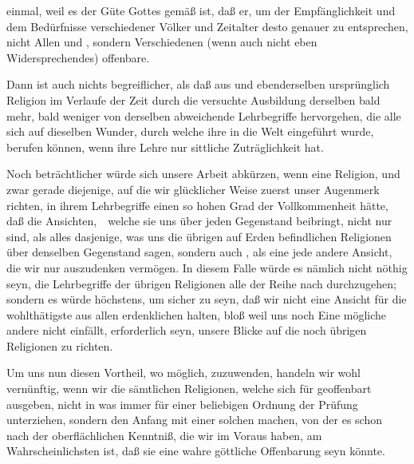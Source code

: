 \begin{aufza}
\begin{aufzb}
\item einmal, weil es der Güte Gottes gemäß ist, daß er, um der Empfänglichkeit und dem Bedürfnisse verschiedener Völker und Zeitalter desto genauer zu entsprechen, nicht Allen  und , sondern Verschiedenen  (wenn auch nicht eben Widersprechendes) offenbare.
\item Dann ist auch nichts begreiflicher, als daß aus  und ebenderselben ursprünglich  Religion im Verlaufe der Zeit durch die versuchte Ausbildung derselben  bald mehr, bald weniger von derselben abweichende Lehrbegriffe hervorgehen, die alle sich auf dieselben Wunder, durch welche ihre  in die Welt eingeführt wurde, berufen können, wenn ihre Lehre nur sittliche Zuträglichkeit hat.
\end{aufzb}
\item Noch beträchtlicher würde sich unsere Arbeit abkürzen, wenn eine Religion, und zwar gerade diejenige, auf die wir glücklicher Weise zuerst unser Augenmerk richten, in ihrem Lehrbegriffe einen so hohen Grad der Vollkommenheit hätte, daß die Ansichten,~\ welche sie uns über jeden Gegenstand beibringt, nicht nur  sind, als alles dasjenige, was uns die übrigen auf Erden befindlichen Religionen über denselben Gegenstand sagen, sondern auch , als eine jede andere Ansicht, die wir nur auszudenken vermögen. In diesem Falle würde es nämlich nicht nöthig seyn, die Lehrbegriffe der übrigen Religionen alle der Reihe nach durchzugehen; sondern es würde höchstens, um sicher zu seyn, daß wir nicht eine Ansicht für die wohlthätigste aus allen erdenklichen halten, bloß weil uns noch Eine mögliche andere nicht einfällt, erforderlich seyn, unsere Blicke  auf die noch übrigen Religionen zu richten.
\item Um uns nun diesen Vortheil, wo möglich, zuzuwenden, handeln wir wohl vernünftig, wenn wir die sämtlichen Religionen, welche sich für geoffenbart ausgeben, nicht in was immer für einer beliebigen Ordnung der Prüfung unterziehen, sondern den Anfang mit einer solchen machen, von der es schon nach der oberflächlichen Kenntniß, die wir im Voraus haben, am Wahrscheinlichsten ist, daß sie eine wahre göttliche Offenbarung seyn könnte.
\end{aufza}

